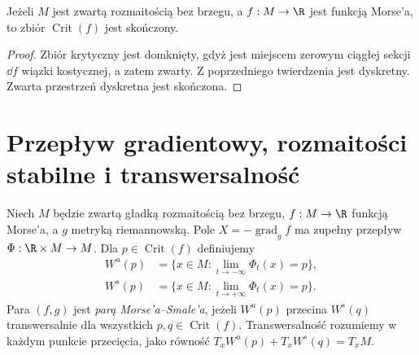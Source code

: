 \begin{wniosek}
Jeżeli $M$ jest zwartą rozmaitością bez brzegu, a $f:M\to\R$ jest
funkcją Morse'a, to zbiór $\operatorname{Crit}(f)$ jest skończony.
\end{wniosek}
\begin{proof}
Zbiór krytyczny jest domknięty, gdyż jest miejscem zerowym ciągłej
sekcji $\dd f$ wiązki kostycznej, a zatem zwarty. Z poprzedniego
twierdzenia jest dyskretny. Zwarta przestrzeń dyskretna jest skończona.
\end{proof}

\section{Przepływ gradientowy, rozmaitości stabilne i transwersalność}
\begin{definicja}
Niech $M$ będzie zwartą gładką rozmaitością bez brzegu,
$f:M\to\R$ funkcją Morse'a, a $g$ metryką riemannowską.
Pole $X=-\operatorname{grad}_g f$ ma zupełny przepływ
$\Phi:\R\times M\to M$. Dla $p\in\operatorname{Crit}(f)$ definiujemy
\begin{align*}
 W^u(p)&=\{x\in M:\lim_{t\to-\infty}\Phi_t(x)=p\},\\
 W^s(p)&=\{x\in M:\lim_{t\to+\infty}\Phi_t(x)=p\}.
\end{align*}
Para $(f,g)$ jest \emph{parą Morse'a--Smale'a}, jeżeli
$W^u(p)$ przecina $W^s(q)$ transwersalnie dla wszystkich
$p,q\in\operatorname{Crit}(f)$. Transwersalność rozumiemy w każdym
punkcie przecięcia, jako równość $T_xW^u(p)+T_xW^s(q)=T_xM$.
\end{definicja}

